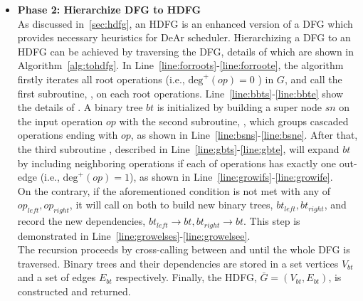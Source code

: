 \documentclass[12pt]{article}
\begin{document}
\begin{CJK}{UTF8}{bkai}
\begin{itemize}
            \item \textbf{Phase 2: Hierarchize DFG to HDFG} \\\indent
                As discussed in~\ref{sec:hdfg}, an HDFG is an enhanced version of a DFG which provides necessary heuristics for DeAr scheduler.
                Hierarchizing a DFG to an HDFG can be achieved by traversing the DFG, details of which are shown in Algorithm~\ref{alg:tohdfg}.
                In Line~\ref{line:forroots}-\ref{line:forroote}, the algorithm firstly iterates all root operations (i.e., $\textrm{deg}^+(op)=0$ ) in $G$,
                and call the first subroutine, , on each root operations.
                Line~\ref{line:bbts}-\ref{line:bbte} show the details of .
                A binary tree $bt$ is initialized by building a super node $sn$ on the input operation $op$ with the second subroutine, , 
                which groups cascaded operations ending with $op$, as shown in Line~\ref{line:bsns}-\ref{line:bsne}.
                After that, the third subroutine , described in Line~\ref{line:gbts}-\ref{line:gbte}, will expand $bt$ by including neighboring operations if each of operations has exactly one out-edge (i.e., $\textrm{deg}^+(op)=1$), as shown in Line~\ref{line:growifs}-\ref{line:growife}. 
                \\\indent
                On the contrary, if the aforementioned condition is not met with any of $op_{left}, op_{right}$, 
                it will call  on both to build new binary trees, $bt_{left}, bt_{right}$,
                and record the new dependencies, $bt_{left} \rightarrow bt, bt_{right} \rightarrow bt$.
                This step is demonstrated in Line~\ref{line:growelses}-\ref{line:growelsee}. 
                \\\indent
                The recursion proceeds by cross-calling between  and  until the whole DFG is traversed.
                Binary trees and their dependencies are stored in a set vertices $V_{bt}$ and a set of edges $E_{bt}$ respectively.
                Finally, the HDFG, $\bar{G} = ( V_{bt} , E_{bt} )$, is constructed and returned.
        \end{itemize}


\end{CJK}
\end{document}
